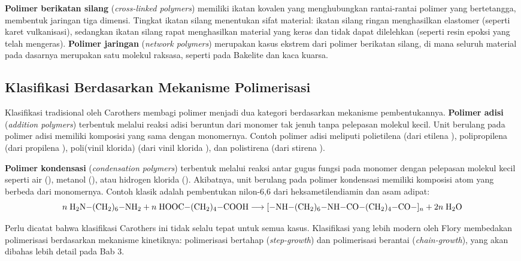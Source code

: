 \documentclass[12pt,a4paper,openany]{book}
\begin{document}
\textbf{Polimer berikatan silang} (\textit{cross-linked polymers}) memiliki ikatan kovalen yang menghubungkan rantai-rantai polimer yang bertetangga, membentuk jaringan tiga dimensi. Tingkat ikatan silang menentukan sifat material: ikatan silang ringan menghasilkan elastomer (seperti karet vulkanisasi), sedangkan ikatan silang rapat menghasilkan material yang keras dan tidak dapat dilelehkan (seperti resin epoksi yang telah mengeras). \textbf{Polimer jaringan} (\textit{network polymers}) merupakan kasus ekstrem dari polimer berikatan silang, di mana seluruh material pada dasarnya merupakan satu molekul raksasa, seperti pada Bakelite dan kaca kuarsa.

\subsection{Klasifikasi Berdasarkan Mekanisme Polimerisasi}

Klasifikasi tradisional oleh Carothers membagi polimer menjadi dua kategori berdasarkan mekanisme pembentukannya. \textbf{Polimer adisi} (\textit{addition polymers}) terbentuk melalui reaksi adisi beruntun dari monomer tak jenuh tanpa pelepasan molekul kecil. Unit berulang pada polimer adisi memiliki komposisi yang sama dengan monomernya. Contoh polimer adisi meliputi polietilena (dari etilena ), polipropilena (dari propilena ), poli(vinil klorida) (dari vinil klorida ), dan polistirena (dari stirena ).

\textbf{Polimer kondensasi} (\textit{condensation polymers}) terbentuk melalui reaksi antar gugus fungsi pada monomer dengan pelepasan molekul kecil seperti air (), metanol (), atau hidrogen klorida (). Akibatnya, unit berulang pada polimer kondensasi memiliki komposisi atom yang berbeda dari monomernya. Contoh klasik adalah pembentukan nilon-6,6 dari heksametilendiamin dan asam adipat:
\begin{equation}
  n\;\ce{H2N-(CH2)6-NH2} + n\;\ce{HOOC-(CH2)4-COOH} \longrightarrow \ce{[-NH-(CH2)6-NH-CO-(CH2)4-CO-]_n} + 2n\;\ce{H2O}
\end{equation}

Perlu dicatat bahwa klasifikasi Carothers ini tidak selalu tepat untuk semua kasus. Klasifikasi yang lebih modern oleh Flory membedakan polimerisasi berdasarkan mekanisme kinetiknya: polimerisasi bertahap (\textit{step-growth}) dan polimerisasi berantai (\textit{chain-growth}), yang akan dibahas lebih detail pada Bab 3.
\end{document}
